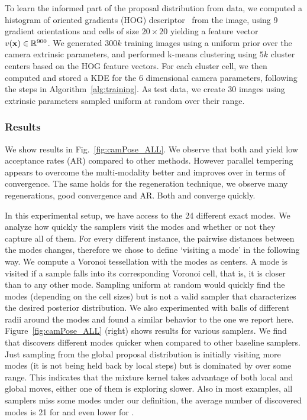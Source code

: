 To learn the informed part of the proposal distribution from data, we
computed a histogram of oriented gradients (HOG)
descriptor~\cite{dalal2005histograms} from the image, using 9
gradient orientations and cells of size $20\times20$ yielding a feature vector
$v(\mathbf{x})\in\mathbb{R}^{900}$. We generated $300k$ training
images using a uniform prior over the camera extrinsic parameters, and
performed k-means clustering using $5k$ cluster centers based on the HOG feature
vectors. For each cluster cell, we then computed and stored a KDE for
the 6 dimensional camera parameters, following the steps in
Algorithm~\ref{alg:training}. As test data, we create 30 images using
extrinsic parameters sampled uniform at random over their range.

\subsubsection{Results}
\label{sec:roomresults}

We show results in Fig.~\ref{fig:camPose_ALL}. We observe that both
\MH and \PT yield low acceptance rates (AR) compared to other methods.
However parallel tempering appears to overcome the multi-modality
better and improves over \MH in terms of convergence. The same holds
for the regeneration technique, we observe many regenerations, good
convergence and AR. Both \INDLMH and \MIXLMH converge quickly.

In this experimental setup, we have access to the 24 different exact modes.
We analyze how quickly the samplers visit
the modes and whether or not they capture all of them. For every
different instance, the pairwise distances between the modes changes,
therefore we chose to define `visiting a mode' in the following way.
We compute a Voronoi tessellation with the modes as centers. A mode is
visited if a sample falls into its corresponding Voronoi cell, that
is, it is closer than to any other mode. Sampling uniform at random
would quickly find the modes (depending on the cell sizes) but is not
a valid sampler that characterizes the desired posterior distribution.
We also experimented with balls of different radii
around the modes and found a similar behavior to the one we report
here. Figure~\ref{fig:camPose_ALL} (right) shows results for various
samplers. We find that \MIXLMH discovers different modes quicker when
compared to other baseline samplers. Just sampling from the global
proposal distribution \INDLMH is initially visiting more modes (it is
not being held back by local steps) but is dominated by \MIXLMH over
some range. This indicates that the mixture kernel takes advantage of
both local and global moves, either one of them is exploring slower.
Also in most examples, all samplers miss some modes under our
definition, the average number of discovered modes is 21 for \MIXLMH
and even lower for \MH.

